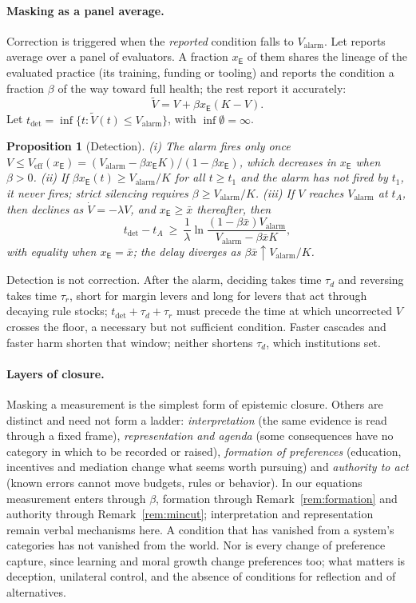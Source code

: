 \documentclass[letterpaper]{article} %
\newtheorem{proposition}{Proposition}
\theoremstyle{definition}
\newcommand{\dE}{\mathsf{E}}
\newcommand{\Valarm}{V_{\mathrm{alarm}}}
\begin{document}
\paragraph{Masking as a panel average.} Correction is triggered when the \emph{reported} condition falls to $\Valarm$. Let reports average over a panel of evaluators. A fraction $x_\dE$ of them shares the lineage of the evaluated practice (its training, funding or tooling) and reports the condition a fraction $\beta$ of the way toward full health; the rest report it accurately:
\begin{equation}\label{eq:y}
\tilde V=V+\beta x_\dE(K-V).
\end{equation}
Let $t_{\mathrm{det}}=\inf\{t:\tilde V(t)\le\Valarm\}$, with $\inf\emptyset=\infty$.

\begin{proposition}[Detection]\label{prop:detect}
(i) The alarm fires only once $V\le V_{\mathrm{eff}}(x_\dE)=(\Valarm-\beta x_\dE K)/(1-\beta x_\dE)$, which decreases in $x_\dE$ when $\beta>0$. (ii) If $\beta x_\dE(t)\ge\Valarm/K$ for all $t\ge t_1$ and the alarm has not fired by $t_1$, it never fires; strict silencing requires $\beta\ge\Valarm/K$. (iii) If $V$ reaches $\Valarm$ at $t_A$, then declines as $\dot V=-\lambda V$, and $x_\dE\ge\bar x$ thereafter, then
\[t_{\mathrm{det}}-t_A\ \ge\ \frac1\lambda\ln\frac{(1-\beta\bar x)\Valarm}{\Valarm-\beta\bar xK},\]
with equality when $x_\dE=\bar x$; the delay diverges as $\beta\bar x\uparrow\Valarm/K$.
\end{proposition}

Detection is not correction. After the alarm, deciding takes time $\tau_d$ and reversing takes time $\tau_r$, short for margin levers and long for levers that act through decaying rule stocks; $t_{\mathrm{det}}+\tau_d+\tau_r$ must precede the time at which uncorrected $V$ crosses the floor, a necessary but not sufficient condition. Faster cascades and faster harm shorten that window; neither shortens $\tau_d$, which institutions set.

\paragraph{Layers of closure.} Masking a measurement is the simplest form of epistemic closure. Others are distinct and need not form a ladder: \emph{interpretation} (the same evidence is read through a fixed frame), \emph{representation and agenda} (some consequences have no category in which to be recorded or raised), \emph{formation of preferences} (education, incentives and mediation change what seems worth pursuing) and \emph{authority to act} (known errors cannot move budgets, rules or behavior). In our equations measurement enters through $\beta$, formation through Remark~\ref{rem:formation} and authority through Remark~\ref{rem:mincut}; interpretation and representation remain verbal mechanisms here. A condition that has vanished from a system's categories has not vanished from the world. Nor is every change of preference capture, since learning and moral growth change preferences too; what matters is deception, unilateral control, and the absence of conditions for reflection and of alternatives.
\end{document}
